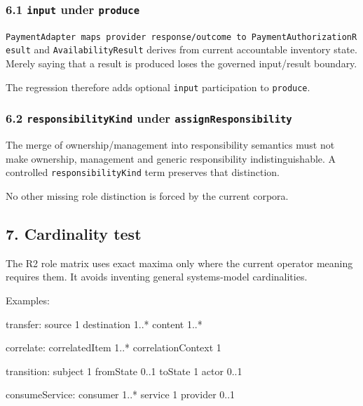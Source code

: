\documentclass[
  10pt,
  a4paper,
]{article}
\newenvironment{Shaded}{}{}
\newcommand{\NormalTok}[1]{#1}
\begin{document}
\subsubsection{\texorpdfstring{6.1 \texttt{input} under
\texttt{produce}}{6.1 input under produce}}\label{61-input-under-produce}

\texttt{PaymentAdapter\ maps\ provider\ response/outcome\ to\ PaymentAuthorizationResult}
and \texttt{AvailabilityResult} derives from current accountable
inventory state. Merely saying that a result is produced loses the
governed input/result boundary.

The regression therefore adds optional \texttt{input} participation to
\texttt{produce}.

\subsubsection{\texorpdfstring{6.2 \texttt{responsibilityKind} under
\texttt{assignResponsibility}}{6.2 responsibilityKind under assignResponsibility}}\label{62-responsibilitykind-under-assignresponsibility}

The merge of ownership/management into responsibility semantics must not
make ownership, management and generic responsibility indistinguishable.
A controlled \texttt{responsibilityKind} term preserves that
distinction.

No other missing role distinction is forced by the current corpora.

\subsection{7. Cardinality test}\label{7-cardinality-test}

The R2 role matrix uses exact maxima only where the current operator
meaning requires them. It avoids inventing general systems-model
cardinalities.

Examples:

\begin{Shaded}
\begin{Highlighting}[]
\NormalTok{transfer:}
\NormalTok{  source       1}
\NormalTok{  destination  1..*}
\NormalTok{  content      1..*}

\NormalTok{correlate:}
\NormalTok{  correlatedItem      1..*}
\NormalTok{  correlationContext  1}

\NormalTok{transition:}
\NormalTok{  subject    1}
\NormalTok{  fromState  0..1}
\NormalTok{  toState    1}
\NormalTok{  actor      0..1}

\NormalTok{consumeService:}
\NormalTok{  consumer   1..*}
\NormalTok{  service    1}
\NormalTok{  provider   0..1}
\end{Highlighting}
\end{Shaded}
\end{document}

